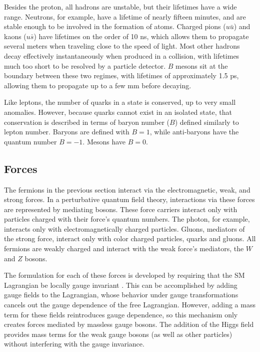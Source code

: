 Besides the proton, all hadrons are unstable, but their lifetimes have a wide range. Neutrons, for example, have a lifetime of nearly fifteen minutes, and are stable enough to be involved in the formation of atoms. Charged pions ($u\bar{u}$) and kaons ($u\bar{s}$) have lifetimes on the order of 10 ns, which allows them to propagate several meters when traveling close to the speed of light. Most other hadrons decay effectively instantaneously when produced in a collision, with lifetimes much too short to be resolved by a particle detector. $B$ mesons sit at the boundary between these two regimes, with lifetimes of approximately 1.5 ps, allowing them to propagate up to a few mm before decaying.  

Like leptons, the number of quarks in a state is conserved, up to very small anomalies. However, because quarks cannot exist in an isolated state, that conservation is described in terms of baryon number ($B$) defined similarly to lepton number. Baryons are defined with $B=1$, while anti-baryons have the quantum number $B=-1$. Mesons have $B = 0$. 

\subsection{Forces}

The fermions in the previous section interact via the electromagnetic, weak, and strong forces. In a perturbative quantum field theory, interactions via these forces are represented by mediating bosons. These force carriers interact only with particles charged with their  force's quantum numbers. The photon, for example, interacts only with electromagnetically charged particles. Gluons, mediators of the strong force, interact only with color charged particles, quarks and gluons. All fermions are weakly charged and interact with the weak force's mediators, the $W$ and $Z$ bosons. 

The formulation for each of these forces is developed by requiring that the \ac{SM} Lagrangian be locally gauge invariant \cite{Griffiths:111880}. This can be accomplished by adding gauge fields to the Lagrangian, whose behavior under gauge transformations cancels out the gauge dependence of the free Lagrangian. However, adding a mass term for these fields reintroduces gauge dependence, so this mechanism only creates forces mediated by massless gauge bosons. The addition of the Higgs field provides mass terms for the weak gauge bosons (as well as other particles) without interfering with the gauge invariance. 

